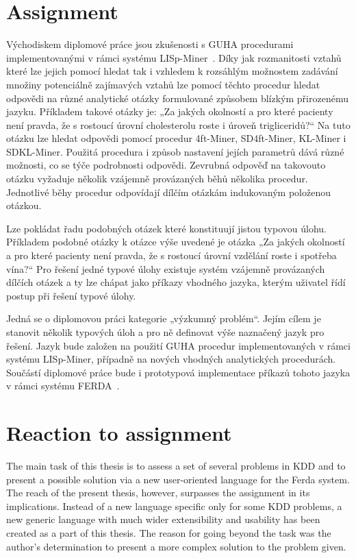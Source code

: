 \documentclass[a4paper,12pt]{book}
\begin{document}
\section{Assignment}
Východiskem diplomové práce jsou zkušenosti s GUHA procedurami implementovanými v rámci systému LISp-Miner~\cite{GMGC}. Díky jak rozmanitosti vztahů které lze jejich pomocí hledat tak i vzhledem k rozsáhlým možnostem zadávání množiny potenciálně zajímavých vztahů lze pomocí těchto procedur hledat odpovědi na různé analytické otázky formulované způsobem blízkým přirozenému jazyku. Příkladem takové otázky je: „Za jakých okolností a pro které pacienty není pravda, že s rostoucí úrovní cholesterolu roste i úroveň trigliceridů?“ Na tuto otázku lze hledat odpovědi pomocí procedur 4ft-Miner, SD4ft-Miner, KL-Miner i SDKL-Miner. Použitá procedura i způsob nastavení jejích parametrů dává různé možnosti, co se týče podrobnosti odpovědi. Zevrubná odpověď na takovouto otázku vyžaduje několik vzájemně provázaných běhů několika procedur. Jednotlivé běhy procedur odpovídají dílčím otázkám indukovaným položenou otázkou.

Lze pokládat řadu podobných otázek které konstituují jistou typovou úlohu. Příkladem podobné otázky k otázce výše uvedené je otázka „Za jakých okolností a pro které pacienty není pravda, že s rostoucí úrovní vzdělání roste i spotřeba vína?“ Pro řešení jedné typové úlohy existuje systém vzájemně provázaných dílčích otázek a ty lze chápat jako příkazy vhodného jazyka, kterým uživatel řídí postup při řešení typové úlohy.

Jedná se o diplomovou práci kategorie „výzkumný problém“. Jejím cílem je stanovit několik typových úloh a pro ně definovat výše naznačený jazyk pro řešení. Jazyk bude založen na použití GUHA procedur implementovaných v rámci systému LISp-Miner, případně na nových vhodných analytických procedurách. Součástí diplomové práce bude i prototypová implementace příkazů tohoto jazyka v rámci systému FERDA~\cite{znalosti2006}.

\section{Reaction to assignment}

The main task of this thesis is to assess a set of several problems in KDD and to present a possible solution via a new user-oriented language for the Ferda system. The reach of the present thesis, however, surpasses the assignment in its implications. Instead of a new language specific only for some KDD problems, a new generic language with much wider extensibility and usability has been created as a part of this thesis. The reason for going beyond the task was the author's determination to present a more complex solution to the problem given. 
\end{document}
